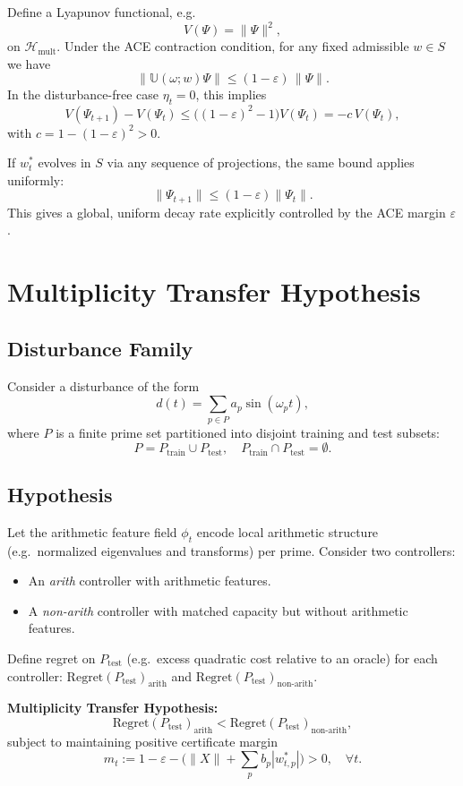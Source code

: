 \documentclass[11pt]{article}
\begin{document}
Define a Lyapunov functional, e.g.
\[
V(\Psi) = \|\Psi\|^2,
\]
on $\mathcal H_{\mathrm{mult}}$. Under the ACE contraction condition, for any fixed admissible $w\in S$ we have
\[
\|\mathbb U(\omega;w)\Psi\|
\le (1-\varepsilon)\,\|\Psi\|.
\]
In the disturbance-free case $\eta_t=0$, this implies
\[
V(\Psi_{t+1}) - V(\Psi_t)
\le \bigl((1-\varepsilon)^2 - 1\bigr)V(\Psi_t)
= -c\,V(\Psi_t),
\]
with $c = 1 - (1-\varepsilon)^2 > 0$.

If $w_t^\ast$ evolves in $S$ via any sequence of projections, the same bound applies uniformly:
\[
\|\Psi_{t+1}\|
\le (1-\varepsilon)\|\Psi_t\|.
\]
This gives a global, uniform decay rate explicitly controlled by the ACE margin $\varepsilon$.

\section{Multiplicity Transfer Hypothesis}

\subsection{Disturbance Family}

Consider a disturbance of the form
\[
d(t) = \sum_{p\in P} a_p \sin(\omega_p t),
\]
where $P$ is a finite prime set partitioned into disjoint training and test subsets:
\[
P = P_{\text{train}}\cup P_{\text{test}},\quad P_{\text{train}}\cap P_{\text{test}}=\emptyset.
\]

\subsection{Hypothesis}

Let the arithmetic feature field $\phi_t$ encode local arithmetic structure (e.g.\ normalized eigenvalues and transforms) per prime. Consider two controllers:
\begin{itemize}
  \item An \emph{arith} controller with arithmetic features.
  \item A \emph{non-arith} controller with matched capacity but without arithmetic features.
\end{itemize}

Define regret on $P_{\text{test}}$ (e.g.\ excess quadratic cost relative to an oracle) for each controller: $\mathrm{Regret}(P_{\text{test}})_{\text{arith}}$ and $\mathrm{Regret}(P_{\text{test}})_{\text{non-arith}}$.

\textbf{Multiplicity Transfer Hypothesis:}
\[
\mathrm{Regret}(P_{\text{test}})_{\text{arith}}
<
\mathrm{Regret}(P_{\text{test}})_{\text{non-arith}},
\]
subject to maintaining positive certificate margin
\[
m_t := 1 - \varepsilon - \bigl(\|X\| + \sum_p b_p |w_{t,p}^\ast|\bigr) > 0,
\quad \forall t.
\]
\end{document}
